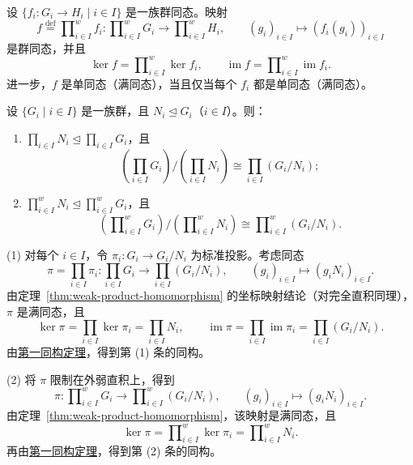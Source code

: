 \begin{theorem}\label{thm:weak-product-homomorphism}
设 $\{f_i:G_i\to H_i\mid i\in I\}$ 是一族群同态。映射
\[
  f\stackrel{\text{def}}{=}\prod\nolimits_{i\in I}^{w}f_i:
  \prod\nolimits_{i\in I}^{w}G_i\longrightarrow\prod\nolimits_{i\in I}^{w}H_i,
  \qquad (g_i)_{i\in I}\longmapsto(f_i(g_i))_{i\in I}
\]
是群同态，并且
\[
  \ker f=\prod\nolimits_{i\in I}^{w}\ker f_i,
  \qquad
  \operatorname{im}f=\prod\nolimits_{i\in I}^{w}\operatorname{im}f_i.
\]
进一步，$f$ 是单同态（满同态），当且仅当每个 $f_i$ 都是单同态（满同态）。
\end{theorem}

\begin{corollary}\label{cor:quotient-direct-products}
设 $\{G_i\mid i\in I\}$ 是一族群，且 $N_i\trianglelefteq G_i$（$i\in I$）。则：
\begin{enumerate}[label=(\arabic*)]
  \item $\prod_{i\in I}N_i\trianglelefteq\prod_{i\in I}G_i$，且
  \[
    \left(\prod_{i\in I}G_i\right)\Big/\left(\prod_{i\in I}N_i\right)
    \cong\prod_{i\in I}(G_i/N_i);
  \]
  \item $\prod\nolimits_{i\in I}^{w}N_i\trianglelefteq\prod\nolimits_{i\in I}^{w}G_i$，且
  \[
    \left(\prod\nolimits_{i\in I}^{w}G_i\right)\Big/\left(\prod\nolimits_{i\in I}^{w}N_i\right)
    \cong\prod\nolimits_{i\in I}^{w}(G_i/N_i).
  \]
\end{enumerate}
\end{corollary}

\begin{purpleproof}
(1) 对每个 $i\in I$，令 $\pi_i:G_i\to G_i/N_i$ 为标准投影。考虑同态
\[
  \pi=\prod_{i\in I}\pi_i:
  \prod_{i\in I}G_i\longrightarrow\prod_{i\in I}(G_i/N_i),
  \qquad (g_i)_{i\in I}\longmapsto(g_iN_i)_{i\in I}.
\]
由定理~\ref{thm:weak-product-homomorphism} 的坐标映射结论（对完全直积同理），$\pi$ 是满同态，且
\[
  \ker\pi=\prod_{i\in I}\ker\pi_i=\prod_{i\in I}N_i,
  \qquad
  \operatorname{im}\pi=\prod_{i\in I}\operatorname{im}\pi_i
  =\prod_{i\in I}(G_i/N_i).
\]
由\hyperref[cor:first-isomorphism]{第一同构定理}，得到第 (1) 条的同构。

(2) 将 $\pi$ 限制在外弱直积上，得到
\[
  \pi:\prod\nolimits_{i\in I}^{w}G_i
  \longrightarrow\prod\nolimits_{i\in I}^{w}(G_i/N_i),
  \qquad (g_i)_{i\in I}\longmapsto(g_iN_i)_{i\in I}.
\]
由定理~\ref{thm:weak-product-homomorphism}，该映射是满同态，且
\[
  \ker\pi=\prod\nolimits_{i\in I}^{w}\ker\pi_i
  =\prod\nolimits_{i\in I}^{w}N_i.
\]
再由\hyperref[cor:first-isomorphism]{第一同构定理}，得到第 (2) 条的同构。
\end{purpleproof}

